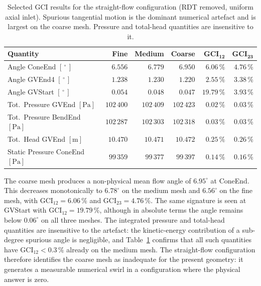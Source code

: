 \begin{table}[h!]
  \centering
  \caption[GCI - straight-flow configuration]{Selected GCI results for the straight-flow configuration (RDT removed, uniform axial inlet). Spurious tangential motion is the dominant numerical artefact and is largest on the coarse mesh. Pressure and total-head quantities are insensitive to it.}
  \label{tab:gci_straight_keep}
  \small
  \begin{tabular}{l r r r r r}
    \toprule
    \textbf{Quantity}                            & \textbf{Fine} & \textbf{Medium} & \textbf{Coarse} & $\mathbf{GCI_{12}}$ & $\mathbf{GCI_{23}}$ \\
    \midrule
    Angle ConeEnd  $[\,^\circ\,]$                & $6.556$       & $6.779$         & $6.950$         & $6.06\,\%$  & $4.76\,\%$  \\
    Angle GVEnd4   $[\,^\circ\,]$                & $1.238$       & $1.230$         & $1.220$         & $2.55\,\%$  & $3.38\,\%$  \\
    Angle GVStart  $[\,^\circ\,]$                & $0.054$       & $0.048$         & $0.047$         & $19.79\,\%$ & $3.93\,\%$  \\
    \midrule
    Tot.\ Pressure GVEnd     $[\mathrm{Pa}]$     & $102\,400$    & $102\,409$      & $102\,423$      & $0.02\,\%$  & $0.03\,\%$  \\
    Tot.\ Pressure BendEnd   $[\mathrm{Pa}]$     & $102\,287$    & $102\,303$      & $102\,318$      & $0.03\,\%$  & $0.03\,\%$  \\
    Tot.\ Head GVEnd $[\mathrm{m}]$              & $10.470$      & $10.471$        & $10.472$        & $0.25\,\%$  & $0.26\,\%$  \\
    Static Pressure ConeEnd $[\mathrm{Pa}]$      & $99\,359$     & $99\,377$       & $99\,397$       & $0.14\,\%$  & $0.16\,\%$  \\
    \bottomrule
  \end{tabular}
\end{table}

The coarse mesh produces a non-physical mean flow angle of $6.95^\circ$ at ConeEnd. This decreases monotonically to $6.78^\circ$ on the medium mesh and $6.56^\circ$ on the fine mesh, with $\mathrm{GCI}_{12} = 6.06\,\%$ and $\mathrm{GCI}_{23} = 4.76\,\%$. The same signature is seen at GVStart with $\mathrm{GCI}_{12} = 19.79\,\%$, although in absolute terms the angle remains below $0.06^\circ$ on all three meshes. The integrated pressure and total-head quantities are insensitive to the artefact: the kinetic-energy contribution of a sub-degree spurious angle is negligible, and Table~\ref{tab:gci_straight_keep} confirms that all such quantities have $\mathrm{GCI}_{12} < 0.3\,\%$ already on the medium mesh. The straight-flow configuration therefore identifies the coarse mesh as inadequate for the present geometry: it generates a measurable numerical swirl in a configuration where the physical answer is zero.

